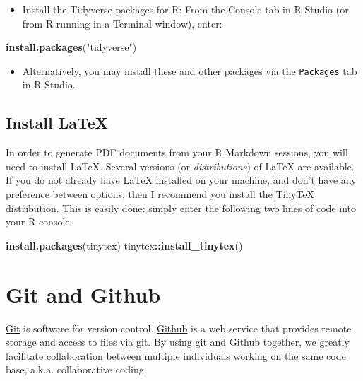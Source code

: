 \documentclass[
]{book}
\newenvironment{Shaded}{\begin{snugshade}}{\end{snugshade}}
\newcommand{\KeywordTok}[1]{\textcolor[rgb]{0.13,0.29,0.53}{\textbf{#1}}}
\newcommand{\NormalTok}[1]{#1}
\newcommand{\OperatorTok}[1]{\textcolor[rgb]{0.81,0.36,0.00}{\textbf{#1}}}
\newcommand{\StringTok}[1]{\textcolor[rgb]{0.31,0.60,0.02}{#1}}
\providecommand{\tightlist}{%
  \setlength{\itemsep}{0pt}\setlength{\parskip}{0pt}}
\begin{document}
\begin{itemize}
\tightlist
\item
  Install the Tidyverse packages for R: From the Console tab in R Studio (or from R running in a Terminal window), enter:
\end{itemize}

\begin{Shaded}
\begin{Highlighting}[]
\KeywordTok{install.packages}\NormalTok{(}\StringTok{"tidyverse"}\NormalTok{)}
\end{Highlighting}
\end{Shaded}

\begin{itemize}
\tightlist
\item
  Alternatively, you may install these and other packages via the \texttt{Packages} tab in R Studio.
\end{itemize}

\hypertarget{install-latex}{%
\subsection{Install LaTeX}\label{install-latex}}

In order to generate PDF documents from your R Markdown sessions, you will need to install LaTeX. Several versions (or \emph{distributions}) of LaTeX are available. If you do not already have LaTeX installed on your machine, and don't have any preference between options, then I recommend you install the \href{https://yihui.org/tinytex/}{TinyTeX} distribution. This is easily done: simply enter the following two lines of code into your R console:

\begin{Shaded}
\begin{Highlighting}[]
\KeywordTok{install.packages}\NormalTok{(}\StringTok{\textquotesingle{}tinytex\textquotesingle{}}\NormalTok{)}
\NormalTok{tinytex}\OperatorTok{::}\KeywordTok{install\_tinytex}\NormalTok{()}
\end{Highlighting}
\end{Shaded}

\hypertarget{git-and-github}{%
\section{Git and Github}\label{git-and-github}}

\href{https://git-scm.com/}{Git} is software for version control. \href{https://github.com/}{Github} is a web service that provides remote storage and access to files via git. By using git and Github together, we greatly facilitate collaboration between multiple individuals working on the same code base, a.k.a. collaborative coding.
\end{document}
